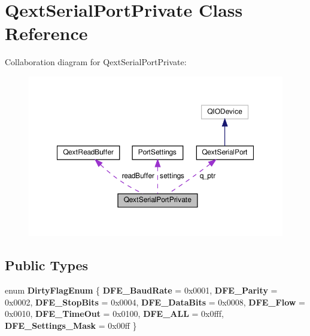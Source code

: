\hypertarget{classQextSerialPortPrivate}{}\section{Qext\+Serial\+Port\+Private Class Reference}
\label{classQextSerialPortPrivate}


Collaboration diagram for Qext\+Serial\+Port\+Private\+:\nopagebreak
\begin{figure}[H]
\begin{center}
\leavevmode
\includegraphics[width=350pt]{classQextSerialPortPrivate__coll__graph}
\end{center}
\end{figure}
\subsection*{Public Types}
\begin{DoxyCompactItemize}
\item 
\mbox{\label{classQextSerialPortPrivate_aa01dd651b5e00ba94515383b08a8bbd5}} 
enum {\bfseries Dirty\+Flag\+Enum} \{ \newline
{\bfseries D\+F\+E\+\_\+\+Baud\+Rate} = 0x0001, 
{\bfseries D\+F\+E\+\_\+\+Parity} = 0x0002, 
{\bfseries D\+F\+E\+\_\+\+Stop\+Bits} = 0x0004, 
{\bfseries D\+F\+E\+\_\+\+Data\+Bits} = 0x0008, 
\newline
{\bfseries D\+F\+E\+\_\+\+Flow} = 0x0010, 
{\bfseries D\+F\+E\+\_\+\+Time\+Out} = 0x0100, 
{\bfseries D\+F\+E\+\_\+\+A\+LL} = 0x0fff, 
{\bfseries D\+F\+E\+\_\+\+Settings\+\_\+\+Mask} = 0x00ff
 \}
\end{DoxyCompactItemize}
